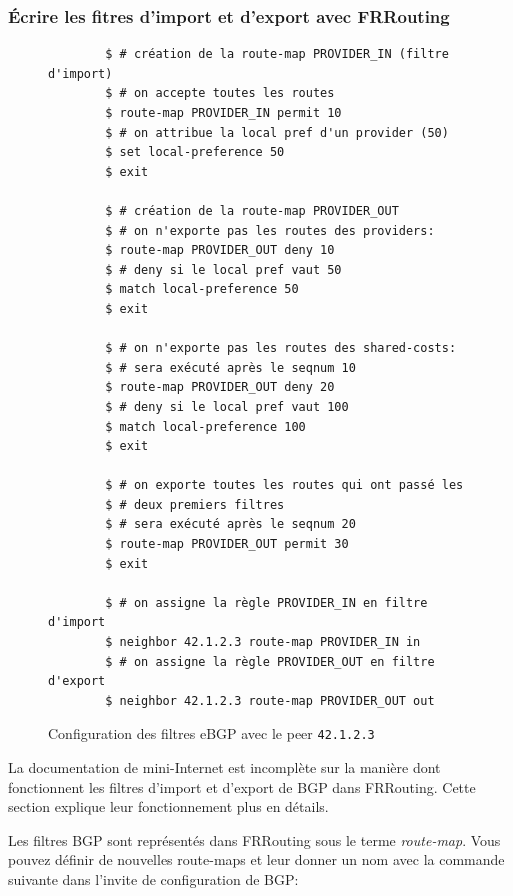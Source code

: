 \documentclass[a4paper, 11pt]{article}
\begin{document}
\subsubsection{Écrire les fitres d'import et d'export avec FRRouting}

\begin{figure}
    \begin{verbatim}
        $ # création de la route-map PROVIDER_IN (filtre d'import)
        $ # on accepte toutes les routes
        $ route-map PROVIDER_IN permit 10
        $ # on attribue la local pref d'un provider (50)
        $ set local-preference 50
        $ exit
    
        $ # création de la route-map PROVIDER_OUT
        $ # on n'exporte pas les routes des providers:
        $ route-map PROVIDER_OUT deny 10
        $ # deny si le local pref vaut 50
        $ match local-preference 50
        $ exit
        
        $ # on n'exporte pas les routes des shared-costs:
        $ # sera exécuté après le seqnum 10
        $ route-map PROVIDER_OUT deny 20
        $ # deny si le local pref vaut 100
        $ match local-preference 100
        $ exit
    
        $ # on exporte toutes les routes qui ont passé les
        $ # deux premiers filtres
        $ # sera exécuté après le seqnum 20
        $ route-map PROVIDER_OUT permit 30
        $ exit
    
        $ # on assigne la règle PROVIDER_IN en filtre d'import
        $ neighbor 42.1.2.3 route-map PROVIDER_IN in
        $ # on assigne la règle PROVIDER_OUT en filtre d'export
        $ neighbor 42.1.2.3 route-map PROVIDER_OUT out
    \end{verbatim}
    \caption{Configuration des filtres eBGP avec le peer \texttt{42.1.2.3}}
    \label{fig:bgp-filters}
    \end{figure}
La documentation de mini-Internet est incomplète sur la manière dont fonctionnent
les filtres d'import et d'export de BGP dans FRRouting. Cette section
explique leur fonctionnement plus en détails.

Les filtres BGP sont représentés dans FRRouting sous le terme
\textit{route-map}. Vous pouvez définir de nouvelles route-maps
et leur donner un nom avec la commande suivante dans l'invite de
configuration de BGP:
\end{document}
